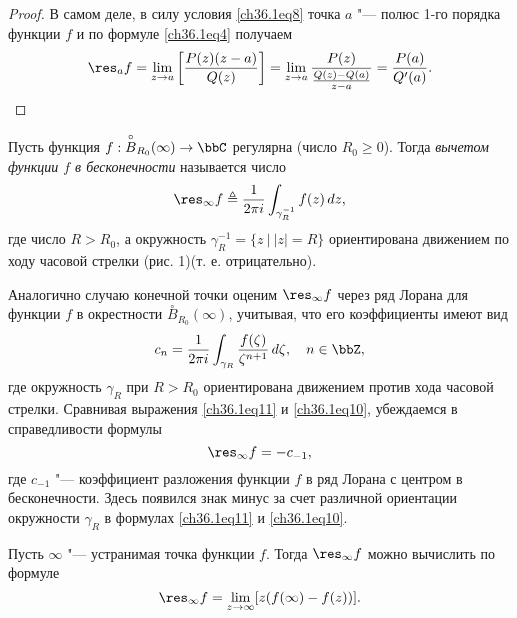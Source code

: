 \begin{proof}
В самом деле, в силу условия \eqref{ch36.1eq8} точка $a$ "--- полюс 1-го порядка функции $f$ и по формуле  \eqref{ch36.1eq4} получаем
$$
\res_{a} f = \lim_{z \to a} \left[ \frac{P(z)(z - a)}{Q(z)}\right] = \lim_{z \to a} \frac{P(z)}{\frac{Q(z) - Q(a)}{z - a}} = \frac{P(a)}{Q'(a)}.
$$
\end{proof}

\begin{defn} \label{ch36defn2}
Пусть функция $f : \overset{\circ}{B}_{R_0}(\infty) \to \bbC$ регулярна (число $R_0 \ge 0$). Тогда \textit{вычетом функции $f$ в бесконечности} называется число
\begin{equation} \label{ch36.1eq10}
\res_{\infty} f \triangleq \frac{1}{2\pi i} \int_{\gamma_R^{-1}} f(z) \,dz,
\end{equation}
где число $R > R_0$, а окружность $\gamma_R^{-1} = \{ z \: \big| \: |z| = R \}$ ориентирована движением по ходу часовой стрелки (рис. 1)(т. е. отрицательно).
\end{defn}

Аналогично случаю конечной точки оценим $\res_{\infty} f$ через ряд Лорана для функции $f$ в окрестности $\overset{\circ}{B}_{R_0}(\infty)$, учитывая, что его коэффициенты имеют вид
\begin{equation} \label{ch36.1eq11}
c_n = \frac{1}{2\pi i} \int_{\gamma_R} \frac{f(\zeta)}{\zeta^{n + 1}} \,d\zeta, \quad n \in \bbZ,
\end{equation}
где окружность $\gamma_R$ при $R > R_0$ ориентирована движением против хода часовой стрелки. Сравнивая выражения \eqref{ch36.1eq11} и \eqref{ch36.1eq10}, убеждаемся в справедливости формулы
\begin{equation} \label{ch36.1eq12}
\res_{\infty} f = -c_{-1},
\end{equation}
где $c_{-1}$ "--- коэффициент разложения функции $f$ в ряд Лорана с центром в бесконечности. Здесь появился знак минус за счет различной ориентации окружности $\gamma_R$ в формулах \eqref{ch36.1eq11} и \eqref{ch36.1eq10}.

\begin{lemm} \label{ch36.1lemm3}
Пусть $\infty$ "--- устранимая точка функции $f$. Тогда $\res_{\infty} f$ можно вычислить по формуле
\begin{equation} \label{ch36.1eq13}
\res_{\infty} f = \lim_{z \to \infty} [z(f(\infty) - f(z))].
\end{equation}

\end{lemm}

